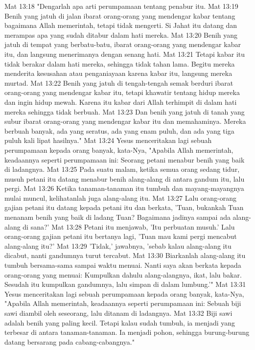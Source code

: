 Mat 13:18  "Dengarlah apa arti perumpamaan tentang penabur itu.
Mat 13:19  Benih yang jatuh di jalan ibarat orang-orang yang mendengar kabar tentang bagaimana Allah memerintah, tetapi tidak mengerti. Si Jahat itu datang dan merampas apa yang sudah ditabur dalam hati mereka.
Mat 13:20  Benih yang jatuh di tempat yang berbatu-batu, ibarat orang-orang yang mendengar kabar itu, dan langsung menerimanya dengan senang hati.
Mat 13:21  Tetapi kabar itu tidak berakar dalam hati mereka, sehingga tidak tahan lama. Begitu mereka menderita kesusahan atau penganiayaan karena kabar itu, langsung mereka murtad.
Mat 13:22  Benih yang jatuh di tengah-tengah semak berduri ibarat orang-orang yang mendengar kabar itu, tetapi khawatir tentang hidup mereka dan ingin hidup mewah. Karena itu kabar dari Allah terhimpit di dalam hati mereka sehingga tidak berbuah.
Mat 13:23  Dan benih yang jatuh di tanah yang subur ibarat orang-orang yang mendengar kabar itu dan memahaminya. Mereka berbuah banyak, ada yang seratus, ada yang enam puluh, dan ada yang tiga puluh kali lipat hasilnya."
Mat 13:24  Yesus menceritakan lagi sebuah perumpamaan kepada orang banyak, kata-Nya, "Apabila Allah memerintah, keadaannya seperti perumpamaan ini: Seorang petani menabur benih yang baik di ladangnya.
Mat 13:25  Pada suatu malam, ketika semua orang sedang tidur, musuh petani itu datang menabur benih alang-alang di antara gandum itu, lalu pergi.
Mat 13:26  Ketika tanaman-tanaman itu tumbuh dan mayang-mayangnya mulai muncul, kelihatanlah juga alang-alang itu.
Mat 13:27  Lalu orang-orang gajian petani itu datang kepada petani itu dan berkata, 'Tuan, bukankah Tuan menanam benih yang baik di ladang Tuan? Bagaimana jadinya sampai ada alang-alang di sana?'
Mat 13:28  Petani itu menjawab, 'Itu perbuatan musuh.' Lalu orang-orang gajian petani itu bertanya lagi, 'Tuan mau kami pergi mencabut alang-alang itu?'
Mat 13:29  'Tidak,' jawabnya, 'sebab kalau alang-alang itu dicabut, nanti gandumnya turut tercabut.
Mat 13:30  Biarkanlah alang-alang itu tumbuh bersama-sama sampai waktu menuai. Nanti saya akan berkata kepada orang-orang yang menuai: Kumpulkan dahulu alang-alangnya, ikat, lalu bakar. Sesudah itu kumpulkan gandumnya, lalu simpan di dalam lumbung.'"
Mat 13:31  Yesus menceritakan lagi sebuah perumpamaan kepada orang banyak, kata-Nya, "Apabila Allah memerintah, keadaannya seperti perumpamaan ini: Sebuah biji sawi diambil oleh seseorang, lalu ditanam di ladangnya.
Mat 13:32  Biji sawi adalah benih yang paling kecil. Tetapi kalau sudah tumbuh, ia menjadi yang terbesar di antara tanaman-tanaman. Ia menjadi pohon, sehingga burung-burung datang bersarang pada cabang-cabangnya."
